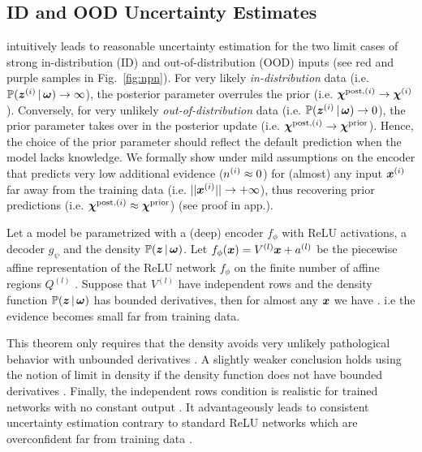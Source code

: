 \subsection{ID and OOD Uncertainty Estimates}
\NatPNacro{} intuitively leads to reasonable uncertainty estimation for the two limit cases of strong in-distribution (ID) and out-of-distribution (OOD) inputs (see red and purple samples in Fig.~\ref{fig:npn}). For very likely \emph{in-distribution} data (i.e. $\operatorname{\mathbb{P}}(\bm{z}^{(i)} \,|\, \bm{\omega}) \rightarrow \infty$), the posterior parameter overrules the prior (i.e. $\bm{\chi}^{\text{post}, (i)} \rightarrow \bm{\chi}^{(i)}$). Conversely, for very unlikely \emph{out-of-distribution} data (i.e. $\operatorname{\mathbb{P}}(\bm{z}^{(i)} \,|\, \bm{\omega}) \rightarrow 0$), the prior parameter takes over in the posterior update (i.e. $\bm{\chi}^{\text{post}, (i)} \rightarrow \bm{\chi}^\text{prior}$). Hence, the choice of the prior parameter should reflect the default prediction when the model lacks knowledge. We formally show under mild assumptions on the encoder that \NatPNacro{} predicts very low additional evidence ($n^{(i)} \approx 0$) for (almost) any input $\bm{x}^{(i)}$ far away from the training data (i.e. $||\bm{x}^{(i)}|| \rightarrow + \infty$), thus recovering prior predictions (i.e. $\bm{\chi}^{\text{post}, (i)} \approx \bm{\chi}^\text{prior}$) (see proof in app.).
\begin{theorem}
\label{thm:oodom-guarantee}
Let a \NatPNacro{} model be parametrized with a (deep) encoder $f_{\phi}$ with ReLU activations, a decoder $g_{\psi}$ and the density $\operatorname{\mathbb{P}}(\bm{z} \,|\, \bm{\omega})$. Let $f_{\phi}(\bm{x})= V^{(l)}\bm{x} + a^{(l)}$ be the piecewise affine representation of the ReLU network $f_{\phi}$ on the finite number of affine regions $Q^{(l)}$ \citep{understanding-nn-relu}. Suppose that $V^{(l)}$ have independent rows and the density function $\operatorname{\mathbb{P}}(\bm{z} \,|\, \bm{\omega})$ has bounded derivatives, then for almost any $\bm{x}$ we have . i.e the evidence becomes small far from training data.
\end{theorem}
This theorem only requires that the density avoids very unlikely pathological behavior with unbounded derivatives \citep{limit-existence-infinity}. A slightly weaker conclusion holds using the notion of limit in density if the density function does not have bounded derivatives \citep{integrable-infinity}. Finally, the independent rows condition is realistic for trained networks with no constant output \citep{overconfident-relu}. It advantageously leads \NatPNacro{} to consistent uncertainty estimation contrary to standard ReLU networks which are overconfident far from training data \citep{overconfident-relu}.


